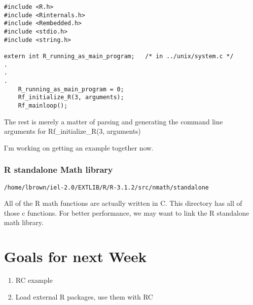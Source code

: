 \begin{verbatim}
#include <R.h>
#include <Rinternals.h>
#include <Rembedded.h>
#include <stdio.h>
#include <string.h>

extern int R_running_as_main_program;   /* in ../unix/system.c */
.
.
.
	R_running_as_main_program = 0;
	Rf_initialize_R(3, arguments);
	Rf_mainloop();
\end{verbatim}

The rest is merely a matter of parsing and generating the command line arguments for Rf\_initialize\_R(3, arguments)

I'm working on getting an example together now.


\subsubsection{R standalone Math library}

\begin{verbatim}
/home/lbrown/iel-2.0/EXTLIB/R/R-3.1.2/src/nmath/standalone
\end{verbatim}

All of the R math functions are actually written in C. This directory has all of those c functions. For better performance, we may want to link the R standalone math library.


\section{Goals for next Week}
\begin{enumerate}
\item RC example
\item Load external R packages, use them with RC
\end{enumerate}



